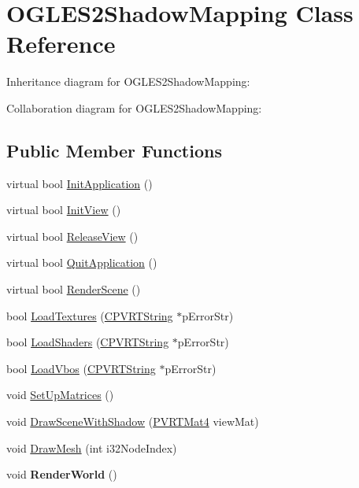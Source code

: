 \hypertarget{class_o_g_l_e_s2_shadow_mapping}{\section{O\+G\+L\+E\+S2\+Shadow\+Mapping Class Reference}
\label{class_o_g_l_e_s2_shadow_mapping}
}


Inheritance diagram for O\+G\+L\+E\+S2\+Shadow\+Mapping\+:


Collaboration diagram for O\+G\+L\+E\+S2\+Shadow\+Mapping\+:
\subsection*{Public Member Functions}
\begin{DoxyCompactItemize}
\item 
virtual bool \hyperlink{class_o_g_l_e_s2_shadow_mapping_a87d54db2842462beab0a62cc75d7b080}{Init\+Application} ()
\item 
virtual bool \hyperlink{class_o_g_l_e_s2_shadow_mapping_a6619d8fb2470311f0c4f76ca5e7c34bc}{Init\+View} ()
\item 
virtual bool \hyperlink{class_o_g_l_e_s2_shadow_mapping_a8e2f72cc05060677b6f4d804c52e2044}{Release\+View} ()
\item 
virtual bool \hyperlink{class_o_g_l_e_s2_shadow_mapping_a785b880be16fee1247cd880f7cb165fb}{Quit\+Application} ()
\item 
virtual bool \hyperlink{class_o_g_l_e_s2_shadow_mapping_ac5ec67d502f806510955a3a7088aa2d4}{Render\+Scene} ()
\item 
bool \hyperlink{class_o_g_l_e_s2_shadow_mapping_a9f6be414ac7515d2af9974d68670fa45}{Load\+Textures} (\hyperlink{class_c_p_v_r_t_string}{C\+P\+V\+R\+T\+String} $\ast$p\+Error\+Str)
\item 
bool \hyperlink{class_o_g_l_e_s2_shadow_mapping_abf19f148d40fa20fedec74d1884295b6}{Load\+Shaders} (\hyperlink{class_c_p_v_r_t_string}{C\+P\+V\+R\+T\+String} $\ast$p\+Error\+Str)
\item 
bool \hyperlink{class_o_g_l_e_s2_shadow_mapping_a75f53c87ca2d4ead3830430af9f17b61}{Load\+Vbos} (\hyperlink{class_c_p_v_r_t_string}{C\+P\+V\+R\+T\+String} $\ast$p\+Error\+Str)
\item 
void \hyperlink{class_o_g_l_e_s2_shadow_mapping_aa9e277233ebfb8552db1b73d4ffb8934}{Set\+Up\+Matrices} ()
\item 
void \hyperlink{class_o_g_l_e_s2_shadow_mapping_a052536583d3c04b9847491f3bcbad4db}{Draw\+Scene\+With\+Shadow} (\hyperlink{struct_p_v_r_t_mat4}{P\+V\+R\+T\+Mat4} view\+Mat)
\item 
void \hyperlink{class_o_g_l_e_s2_shadow_mapping_acd8189bb445bf7e8cf839d0704309b5f}{Draw\+Mesh} (int i32\+Node\+Index)
\item 
\hypertarget{class_o_g_l_e_s2_shadow_mapping_a02e405b2616caab94b9b242f8b7fcb30}{void {\bfseries Render\+World} ()}\label{class_o_g_l_e_s2_shadow_mapping_a02e405b2616caab94b9b242f8b7fcb30}

\end{DoxyCompactItemize}



